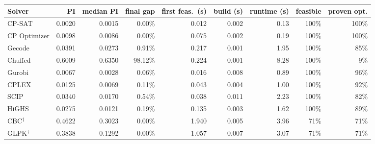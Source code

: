 \begin{tabular}{lrrrrrrrr}
\toprule
Solver & PI & median PI & final gap & first feas.\ (s) & build (s) & runtime (s) & feasible & proven opt. \\
\midrule
CP-SAT & 0.0020 & 0.0015 & 0.00\% & 0.012 & 0.002 & 0.13 & 100\% & 100\% \\
CP Optimizer & 0.0098 & 0.0086 & 0.00\% & 0.075 & 0.002 & 0.19 & 100\% & 100\% \\
Gecode & 0.0391 & 0.0273 & 0.91\% & 0.217 & 0.001 & 1.95 & 100\% & 85\% \\
Chuffed & 0.6009 & 0.6350 & 98.12\% & 0.224 & 0.001 & 8.28 & 100\% & 9\% \\
Gurobi & 0.0067 & 0.0028 & 0.06\% & 0.016 & 0.008 & 0.89 & 100\% & 96\% \\
CPLEX & 0.0125 & 0.0069 & 0.11\% & 0.043 & 0.004 & 1.00 & 100\% & 92\% \\
SCIP & 0.0340 & 0.0170 & 0.54\% & 0.038 & 0.011 & 2.23 & 100\% & 82\% \\
HiGHS & 0.0275 & 0.0121 & 0.19\% & 0.135 & 0.003 & 1.62 & 100\% & 89\% \\
CBC$^\dagger$ & 0.4622 & 0.3023 & 0.00\% & 1.940 & 0.005 & 3.96 & 71\% & 71\% \\
GLPK$^\dagger$ & 0.3838 & 0.1292 & 0.00\% & 1.057 & 0.007 & 3.07 & 71\% & 71\% \\
\bottomrule
\end{tabular}
